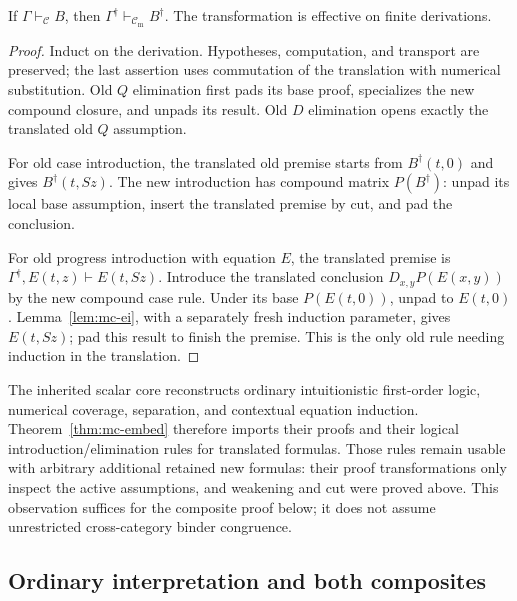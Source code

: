 \begin{theorem}
\label{thm:mc-embed}
If $\Gamma\vdash_{\mathcal C}B$, then
$\Gamma^\dagger\vdash_{\mathcal C_{\mathrm m}}B^\dagger$.
The transformation is effective on finite derivations.
\end{theorem}
\begin{proof}
Induct on the derivation.  Hypotheses, computation, and transport are
preserved; the last assertion uses commutation of the translation
with numerical substitution.  Old $Q$ elimination first pads its
base proof, specializes the new compound closure, and unpads its
result.  Old $D$ elimination opens exactly the translated old $Q$
assumption.

For old case introduction, the translated old premise starts from
$B^\dagger(t,0)$ and gives $B^\dagger(t,Sz)$.  The new introduction
has compound matrix $P(B^\dagger)$: unpad its local base assumption,
insert the translated premise by cut, and pad the conclusion.

For old progress introduction with equation $E$, the translated
premise is $\Gamma^\dagger,E(t,z)\vdash E(t,Sz)$.  Introduce the
translated conclusion $D_{x,y}P(E(x,y))$ by the new compound case
rule.  Under its base $P(E(t,0))$, unpad to $E(t,0)$.
Lemma~\ref{lem:mc-ei}, with a separately fresh induction parameter,
gives $E(t,Sz)$; pad this result to finish the premise.  This is the
only old rule needing induction in the translation.
\end{proof}

The inherited scalar core reconstructs ordinary intuitionistic
first-order logic, numerical coverage, separation, and contextual
equation induction.  Theorem~\ref{thm:mc-embed} therefore imports
their proofs and their logical introduction/elimination rules for
translated formulas.  Those rules remain usable with arbitrary
additional retained new formulas: their proof transformations only
inspect the active assumptions, and weakening and cut were proved
above.  This observation suffices for the composite proof below;
it does not assume unrestricted cross-category binder congruence.

\subsection{Ordinary interpretation and both composites}

